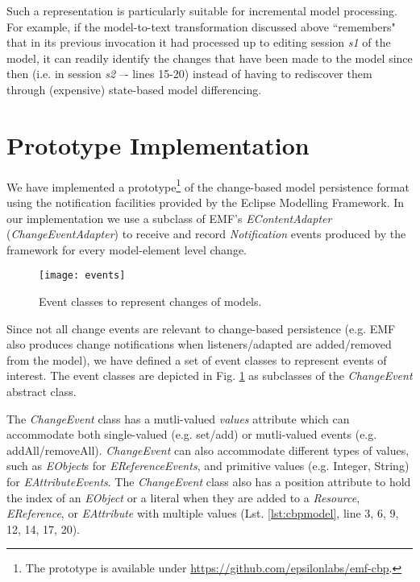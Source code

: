 Such a representation is particularly suitable for incremental model processing. For example, if the model-to-text transformation discussed above ``remembers" that in its previous invocation it had processed up to editing session \emph{s1} of the model, it can readily identify the changes that have been made to the model since then (i.e. in session \emph{s2} –- lines 15-20) instead of having to rediscover them through (expensive) state-based model differencing.

\section{Prototype Implementation}
\label{sec:prototype_implementation}
We have implemented a prototype\footnote{The prototype is available under \url{https://github.com/epsilonlabs/emf-cbp}.} of the change-based model persistence format using the notification facilities provided by the Eclipse Modelling Framework. In our implementation we use a subclass of EMF's \emph{EContentAdapter} (\emph{ChangeEventAdapter}) to receive and record \emph{Notification} events produced by the framework for every model-element level change.

\begin{figure}[th]
    \centering
    \texttt{[image: events]}
    \caption{Event classes to represent changes of models.}
    \label{fig:events}
\end{figure}

Since not all change events are relevant to change-based persistence (e.g. EMF also produces change notifications when listeners/adapted are added/removed from the model), we have defined a set of event classes to represent events of interest. The event classes are depicted in Fig. \ref{fig:events} as subclasses of the \emph{ChangeEvent} abstract class.  %

The \emph{ChangeEvent} class has a mutli-valued \emph{values} attribute which can accommodate both single-valued (e.g. set/add) or mutli-valued events (e.g. addAll/removeAll). \emph{ChangeEvent} can also accommodate different types of values, such as \emph{EObject}s for \emph{EReferenceEvents}, and primitive values (e.g. Integer, String) for \emph{EAttributeEvents}. The \emph{ChangeEvent} class also has a position attribute to hold the  index of an \emph{EObject} or a literal when they are added to a \emph{Resource}, \emph{EReference}, or \emph{EAttribute} with multiple values (Lst. \ref{lst:cbpmodel}, line 3, 6, 9, 12, 14, 17, 20). 

